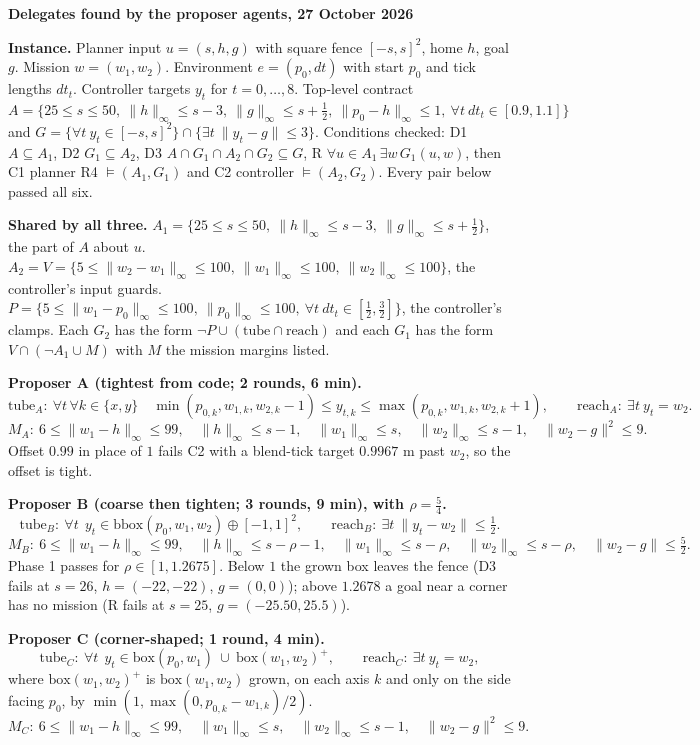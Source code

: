 \documentclass[10pt]{article}
\newcommand{\ninf}[1]{\lVert #1\rVert_\infty}
\begin{document}
{\Large\bfseries Delegates found by the proposer agents, 27 October 2026}

\textbf{Instance.} Planner input $u=(s,h,g)$ with square fence $[-s,s]^2$, home $h$, goal $g$. Mission $w=(w_1,w_2)$. Environment $e=(p_0,dt)$ with start $p_0$ and tick lengths $dt_t$. Controller targets $y_t$ for $t=0,\dots,8$. Top-level contract $A=\{25\le s\le50,\ \ninf{h}\le s-3,\ \ninf{g}\le s+\tfrac12,\ \ninf{p_0-h}\le1,\ \forall t\ dt_t\in[0.9,1.1]\}$ and $G=\{\forall t\ y_t\in[-s,s]^2\}\cap\{\exists t\ \lVert y_t-g\rVert\le3\}$. Conditions checked: D1 $A\subseteq A_1$, D2 $G_1\subseteq A_2$, D3 $A\cap G_1\cap A_2\cap G_2\subseteq G$, R $\forall u\in A_1\,\exists w\,G_1(u,w)$, then C1 planner R4 $\models(A_1,G_1)$ and C2 controller $\models(A_2,G_2)$. Every pair below passed all six.

\textbf{Shared by all three.} $A_1=\{25\le s\le50,\ \ninf{h}\le s-3,\ \ninf{g}\le s+\tfrac12\}$, the part of $A$ about $u$. $A_2=V=\{5\le\ninf{w_2-w_1}\le100,\ \ninf{w_1}\le100,\ \ninf{w_2}\le100\}$, the controller's input guards. $P=\{5\le\ninf{w_1-p_0}\le100,\ \ninf{p_0}\le100,\ \forall t\ dt_t\in[\tfrac12,\tfrac32]\}$, the controller's clamps. Each $G_2$ has the form $\lnot P\cup(\text{tube}\cap\text{reach})$ and each $G_1$ has the form $V\cap(\lnot A_1\cup M)$ with $M$ the mission margins listed.

\textbf{Proposer A (tightest from code; 2 rounds, 6 min).}
\[
\text{tube}_A:\ \forall t\,\forall k\in\{x,y\}\quad \min(p_{0,k},w_{1,k},w_{2,k}-1)\le y_{t,k}\le\max(p_{0,k},w_{1,k},w_{2,k}+1),\qquad \text{reach}_A:\ \exists t\ y_t=w_2 .
\]
\[
M_A:\ 6\le\ninf{w_1-h}\le99,\quad \ninf{h}\le s-1,\quad \ninf{w_1}\le s,\quad \ninf{w_2}\le s-1,\quad \lVert w_2-g\rVert^2\le9 .
\]
Offset $0.99$ in place of $1$ fails C2 with a blend-tick target $0.9967$ m past $w_2$, so the offset is tight.

\textbf{Proposer B (coarse then tighten; 3 rounds, 9 min), with $\rho=\tfrac54$.}
\[
\text{tube}_B:\ \forall t\ \ y_t\in\mathrm{bbox}(p_0,w_1,w_2)\oplus[-1,1]^2,\qquad \text{reach}_B:\ \exists t\ \lVert y_t-w_2\rVert\le\tfrac12 .
\]
\[
M_B:\ 6\le\ninf{w_1-h}\le99,\quad \ninf{h}\le s-\rho-1,\quad \ninf{w_1}\le s-\rho,\quad \ninf{w_2}\le s-\rho,\quad \lVert w_2-g\rVert\le\tfrac52 .
\]
Phase 1 passes for $\rho\in[1,1.2675]$. Below $1$ the grown box leaves the fence (D3 fails at $s=26$, $h=(-22,-22)$, $g=(0,0)$); above $1.2678$ a goal near a corner has no mission (R fails at $s=25$, $g=(-25.50,25.5)$).

\textbf{Proposer C (corner-shaped; 1 round, 4 min).}
\[
\text{tube}_C:\ \forall t\ \ y_t\in\mathrm{box}(p_0,w_1)\ \cup\ \mathrm{box}(w_1,w_2)^{+},\qquad \text{reach}_C:\ \exists t\ y_t=w_2,
\]
where $\mathrm{box}(w_1,w_2)^{+}$ is $\mathrm{box}(w_1,w_2)$ grown, on each axis $k$ and only on the side facing $p_0$, by $\min(1,\max(0,p_{0,k}-w_{1,k})/2)$.
\[
M_C:\ 6\le\ninf{w_1-h}\le99,\quad \ninf{w_1}\le s,\quad \ninf{w_2}\le s-1,\quad \lVert w_2-g\rVert^2\le9 .
\]
\end{document}
